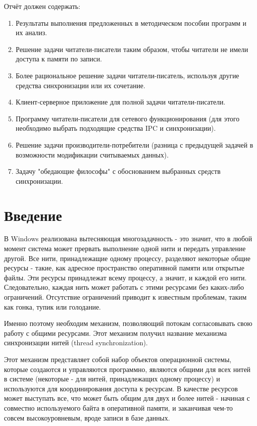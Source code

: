 \documentclass[a4paper, 12pt]{article}		%
\begin{document}
Отчёт должен содержать:
\begin{enumerate}
\item Результаты выполнения предложенных в методическом пособии программ и их анализ.
\item Решение задачи читатели-писатели таким образом, чтобы читатели не имели доступа к памяти по записи.
\item Более рациональное решение задачи читатели-писатель, используя другие средства синхронизации или их сочетание.
\item Клиент-серверное приложение для полной задачи читатели-писатели.
\item Программу читатели-писатели для сетевого функционирования (для этого необходимо выбрать подходящие средства IPC и синхронизации).
\item Решение задачи производители-потребители (разница с предыдущей задачей в возможности модификации считываемых данных).
\item Задачу "обедающие философы" с обоснованием выбранных средств синхронизации.
\end{enumerate}

\newpage
\section*{Введение}

В Windows реализована вытесняющая многозадачность - это значит, что в любой момент система может прервать выполнение одной нити и передать управление другой. Все нити, принадлежащие одному процессу, разделяют некоторые общие ресурсы - такие, как адресное пространство оперативной памяти или открытые файлы. Эти ресурсы принадлежат всему процессу, а значит, и каждой его нити. Следовательно, каждая нить может работать с этими ресурсами без каких-либо ограничений. Отсутствие ограничений приводит к известным проблемам, таким как гонка, тупик или голодание.

Именно поэтому необходим механизм, позволяющий потокам согласовывать свою работу с общими ресурсами. Этот механизм получил название механизма синхронизации нитей (thread synchronization).

Этот механизм представляет собой набор объектов операционной системы, которые создаются и управляются программно, являются общими для всех нитей в системе (некоторые - для нитей, принадлежащих одному процессу) и используются для координирования доступа к ресурсам. В качестве ресурсов может выступать все, что может быть общим для двух и более нитей - начиная с совместно используемого байта в оперативной памяти, и заканчивая чем-то совсем высокоуровневым, вроде записи в базе данных.
\end{document}
